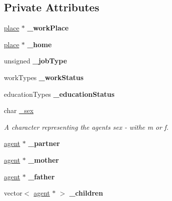 \subsection*{Private Attributes}
\begin{DoxyCompactItemize}
\item 
\mbox{\label{classagent_a232bde3d6f75bac6c1fba313b7124b13}} 
\mbox{\hyperlink{classplace}{place}} $\ast$ {\bfseries \+\_\+work\+Place}
\item 
\mbox{\label{classagent_a6db9c370528e73527b4d7a8b00ffab23}} 
\mbox{\hyperlink{classplace}{place}} $\ast$ {\bfseries \+\_\+home}
\item 
\mbox{\label{classagent_a4155df9fba51d2a5387b266e74f0703e}} 
unsigned {\bfseries \+\_\+job\+Type}
\item 
\mbox{\label{classagent_a79ee05496cc1bc2d806fbb70a45d9f99}} 
work\+Types {\bfseries \+\_\+work\+Status}
\item 
\mbox{\label{classagent_abbfd4798d2b47e4b418a9aefa75fd75b}} 
education\+Types {\bfseries \+\_\+education\+Status}
\item 
\mbox{\label{classagent_ad2e0f7c2a20dcfa12f07a07520ee7e4a}} 
char \mbox{\hyperlink{classagent_ad2e0f7c2a20dcfa12f07a07520ee7e4a}{\+\_\+sex}}
\begin{DoxyCompactList}\small\item\em A character representing the agent\textquotesingle{}s sex -\/ withe \textquotesingle{}m\textquotesingle{} or \textquotesingle{}f\textquotesingle{}. \end{DoxyCompactList}\item 
\mbox{\label{classagent_a54b776c2ea81520b05c683632bed82fd}} 
\mbox{\hyperlink{classagent}{agent}} $\ast$ {\bfseries \+\_\+partner}
\item 
\mbox{\label{classagent_abff69cc5e2c8b7dcbd4c6eeeb9323a08}} 
\mbox{\hyperlink{classagent}{agent}} $\ast$ {\bfseries \+\_\+mother}
\item 
\mbox{\label{classagent_ae55ddedf072040f0cb8930217660e697}} 
\mbox{\hyperlink{classagent}{agent}} $\ast$ {\bfseries \+\_\+father}
\item 
\mbox{\label{classagent_af42fc69cd57f652287501750499c6024}} 
vector$<$ \mbox{\hyperlink{classagent}{agent}} $\ast$ $>$ {\bfseries \+\_\+children}
\end{DoxyCompactItemize}


